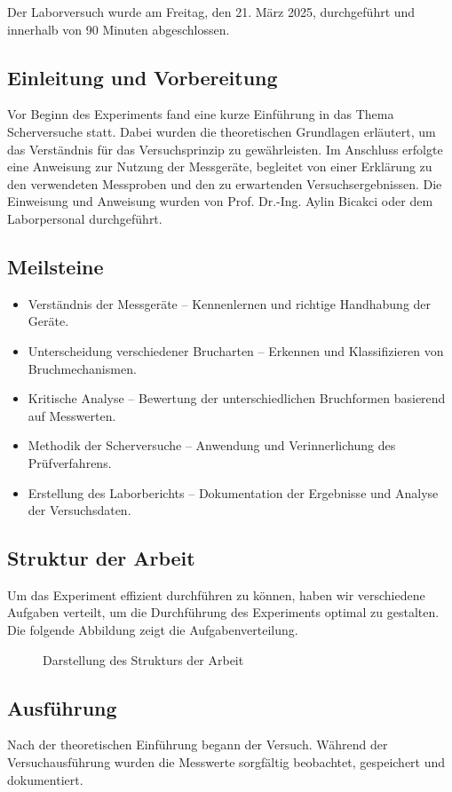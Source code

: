 Der Laborversuch wurde am Freitag, den 21. März 2025, durchgeführt und innerhalb von 90 Minuten abgeschlossen.
\subsection{Einleitung und Vorbereitung}
Vor Beginn des Experiments fand eine kurze Einführung in das Thema Scherversuche statt. Dabei wurden die theoretischen Grundlagen erläutert, um das Verständnis für das Versuchsprinzip zu gewährleisten.
Im Anschluss erfolgte eine Anweisung zur Nutzung der Messgeräte, begleitet von einer Erklärung zu den verwendeten Messproben und den zu erwartenden Versuchsergebnissen.
Die Einweisung und Anweisung wurden von Prof. Dr.-Ing. Aylin Bicakci oder dem Laborpersonal durchgeführt.
\subsection{Meilsteine}
\begin{itemize}
    \item Verständnis der Messgeräte – Kennenlernen und richtige Handhabung der Geräte.
    \item Unterscheidung verschiedener Brucharten – Erkennen und Klassifizieren von Bruchmechanismen.
    \item Kritische Analyse – Bewertung der unterschiedlichen Bruchformen basierend auf Messwerten.
    \item Methodik der Scherversuche – Anwendung und Verinnerlichung des Prüfverfahrens.
    \item Erstellung des Laborberichts – Dokumentation der Ergebnisse und Analyse der Versuchsdaten.
\end{itemize}
\subsection{Struktur der Arbeit}
Um das Experiment effizient durchführen zu können, haben wir verschiedene Aufgaben verteilt, um die Durchführung des Experiments optimal zu gestalten. Die folgende Abbildung zeigt die Aufgabenverteilung.
\begin{figure}[H]
    \centering
    \caption{Darstellung des Strukturs der Arbeit}
    \label{Abb. :Darstellung des Strukturs der Arbeit}
\end{figure}
\subsection{Ausführung}
Nach der theoretischen Einführung begann der Versuch. Während der Versuchausführung wurden die Messwerte sorgfältig beobachtet, gespeichert und dokumentiert.
